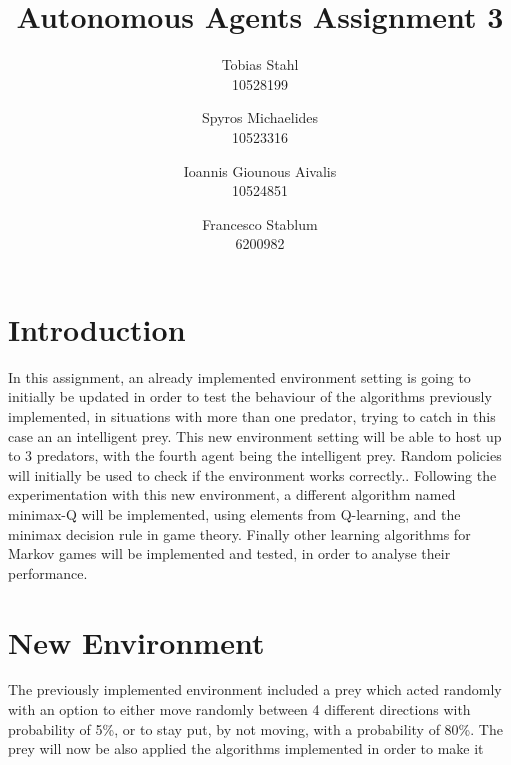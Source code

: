 \documentclass[a4paper,10pt]{article}
\title{
	\textbf{Autonomous Agents Assignment 3}
}
\author{Tobias Stahl \\ 10528199 \and Spyros Michaelides \\ 10523316 \and Ioannis Giounous Aivalis \\ 10524851 \and Francesco Stablum \\ 6200982}
\begin{document}
\maketitle


\section{Introduction}
In this assignment, an already implemented environment setting is going to initially be updated in order to test the behaviour of the algorithms previously implemented, in situations with more than one predator, trying to catch in this case an an intelligent prey. This new environment setting will be able to host up to 3 predators, with the fourth agent being the intelligent prey. Random policies will initially be used to check if the environment works correctly..
Following the experimentation with this new environment, a different algorithm named minimax-Q will be implemented, using elements from Q-learning, and the minimax decision rule in game theory.
Finally other learning algorithms for Markov games will be implemented and tested, in order to analyse their performance.












\section{New Environment}
The previously implemented environment included a prey which acted randomly with an option to either move randomly between 4 different directions with probability   of 5\%, or to stay put, by not moving, with a probability of 80\%. The prey will now be also applied the algorithms implemented in order to make it
\end{document}
